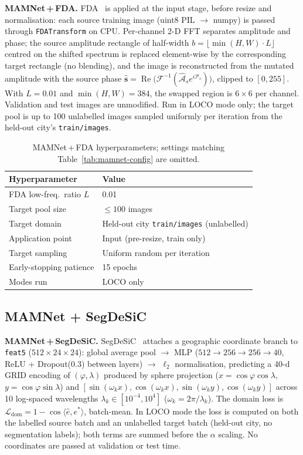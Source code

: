 \textbf{MAMNet\,+\,FDA.}
FDA~\cite{fda} is applied at the input stage, before resize and
normalisation: each source training image (uint8 PIL $\to$ numpy) is
passed through \texttt{FDATransform} on CPU.  Per-channel 2-D FFT
separates amplitude and phase; the source amplitude rectangle of
half-width $b{=}\lfloor\min(H,W)\cdot L\rfloor$ centred on the shifted
spectrum is replaced element-wise by the corresponding target
rectangle (no blending), and the image is reconstructed from the
mutated amplitude with the source phase
$\hat{\mathbf{s}} = \operatorname{Re}\bigl(\mathcal{F}^{-1}(\hat{\mathcal{A}}_s
e^{i\mathcal{P}_s})\bigr)$, clipped to $[0,255]$.
With $L{=}0.01$ and $\min(H,W){=}384$, the swapped region is $6{\times}6$
per channel.  Validation and test images are unmodified.  Run in LOCO
mode only; the target pool is up to 100 unlabelled images sampled
uniformly per iteration from the held-out city's \texttt{train/images}.

\begin{table}[h]
\centering
\caption{MAMNet\,+\,FDA hyperparameters; settings matching
Table~\ref{tab:mamnet-config} are omitted.}
\label{tab:mamnet-fda}
\small
\begin{tabular}{@{}ll@{}}
\toprule
\textbf{Hyperparameter} & \textbf{Value} \\
\midrule
FDA low-freq.\ ratio $L$ & 0.01 \\
Target pool size         & $\leq 100$ images \\
Target domain            & Held-out city \texttt{train/images} (unlabelled) \\
Application point        & Input (pre-resize, train only) \\
Target sampling          & Uniform random per iteration \\
Early-stopping patience  & 15 epochs \\
Modes run                & LOCO only \\
\bottomrule
\end{tabular}
\end{table}

\subsection{MAMNet + SegDeSiC}

\textbf{MAMNet\,+\,SegDeSiC.}
SegDeSiC~\cite{segdesicnet} attaches a geographic coordinate
branch to \texttt{feat5} ($512{\times}24{\times}24$): global average
pool $\to$ MLP
($512{\to}256{\to}256{\to}40$, ReLU + Dropout(0.3) between layers)
$\to$ $\ell_2$ normalisation, predicting a 40-d GRID encoding of
$(\varphi,\lambda)$ produced by sphere projection
($x{=}\cos\varphi\cos\lambda$, $y{=}\cos\varphi\sin\lambda$) and
$[\sin(\omega_k x),\cos(\omega_k x),\sin(\omega_k y),\cos(\omega_k y)]$
across 10 log-spaced wavelengths
$\lambda_k\in[10^{-4},10^{4}]$ ($\omega_k{=}2\pi/\lambda_k$).
The domain loss is
$\mathcal{L}_{\text{dom}}{=}1-\cos\langle\hat{e},e^{*}\rangle$,
batch-mean.
In LOCO mode the loss is computed on both the labelled source batch
and an unlabelled target batch (held-out city, no segmentation labels);
both terms are summed before the $\alpha$ scaling.  No coordinates are
passed at validation or test time.  

